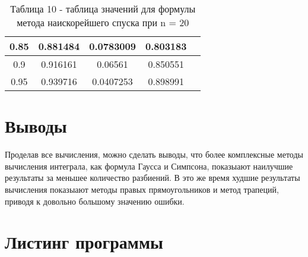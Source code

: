 \documentclass[a4paper,12pt]{article}
\begin{document}
{\begin{enumerate}[label = \arabic*.]
{\begin{table}[h]
\begin{tabular}{|c|c|c|c|c|}
            \hline
            0.85 &     0.881484 &    0.0783009 &     0.803183\\
            \hline
            0.9 &     0.916161 &      0.06561 &     0.850551\\
            \hline
            0.95 &     0.939716 &    0.0407253 &     0.898991\\
            \hline
            \end{tabular}
            \caption*{\small{Таблица 10 - таблица значений для формулы метода наискорейшего спуска при n = 20}}
          \end{table}
    }
    \newpage
\end{enumerate}

\section{Выводы}
\hspace{1.25cm}Проделав все вычисления, можно сделать выводы, что более комплексные методы вычисления интеграла, как формула Гаусса и Симпсона, показыают наилучшие результа\-ты за меньшее количество разбиений. В это же время худшие результаты вычисления показыают методы правых прямоугольников и метод трапеций, приводя к довольно большому значению ошибки.}
\clearpage
\section{Листинг программы}

\end{document}

